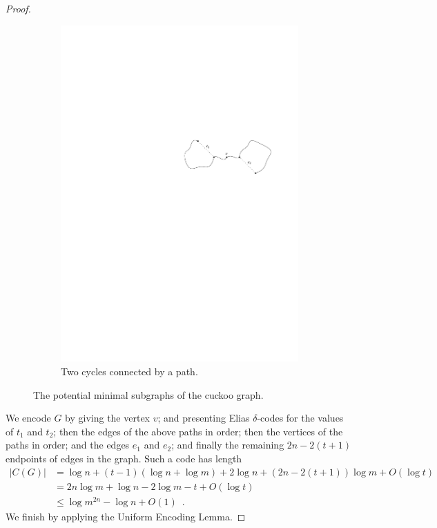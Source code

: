 \documentclass{patmorin}
\begin{document}
\begin{proof}
\begin{figure}
\begin{subfigure}[b]{0.6\textwidth}
      \includegraphics{cuckoo2}
      \caption{Two cycles connected by a path.}
    \end{subfigure}
    \caption{The potential minimal subgraphs of the cuckoo graph.}
  \end{figure}

  We encode $G$ by giving the vertex $v$; and presenting Elias
  $\delta$-codes for the values of $t_1$ and $t_2$; then the edges of
  the above paths in order; then the vertices of the paths in order;
  and the edges $e_1$ and $e_2$; and finally the remaining $2n - 2(t +
  1)$ endpoints of edges in the graph. Such a code has length
  \begin{align*}
    |C(G)| &= \log n + (t - 1)(\log n + \log m) + 2\log n + (2n - 2(t + 1))\log m + O(\log t) \\
           &= 2n \log m + \log n - 2\log m - t + O(\log t) \\
           &\leq \log m^{2n} - \log n + O(1) \enspace .
  \end{align*}
  We finish by applying the Uniform Encoding Lemma.
\end{proof}
\end{document}
